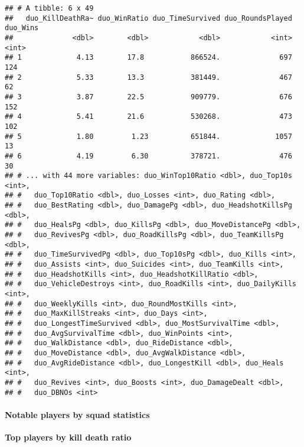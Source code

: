 \documentclass[]{article}
\let\oldparagraph\paragraph
\renewcommand{\paragraph}[1]{\oldparagraph{#1}\mbox{}}
\begin{document}
\begin{verbatim}
## # A tibble: 6 x 49
##   duo_KillDeathRa~ duo_WinRatio duo_TimeSurvived duo_RoundsPlayed duo_Wins
##              <dbl>        <dbl>            <dbl>            <int>    <int>
## 1             4.13        17.8           866524.              697      124
## 2             5.33        13.3           381449.              467       62
## 3             3.87        22.5           909779.              676      152
## 4             5.41        21.6           530268.              473      102
## 5             1.80         1.23          651844.             1057       13
## 6             4.19         6.30          378721.              476       30
## # ... with 44 more variables: duo_WinTop10Ratio <dbl>, duo_Top10s <int>,
## #   duo_Top10Ratio <dbl>, duo_Losses <int>, duo_Rating <dbl>,
## #   duo_BestRating <dbl>, duo_DamagePg <dbl>, duo_HeadshotKillsPg <dbl>,
## #   duo_HealsPg <dbl>, duo_KillsPg <dbl>, duo_MoveDistancePg <dbl>,
## #   duo_RevivesPg <dbl>, duo_RoadKillsPg <dbl>, duo_TeamKillsPg <dbl>,
## #   duo_TimeSurvivedPg <dbl>, duo_Top10sPg <dbl>, duo_Kills <int>,
## #   duo_Assists <int>, duo_Suicides <int>, duo_TeamKills <int>,
## #   duo_HeadshotKills <int>, duo_HeadshotKillRatio <dbl>,
## #   duo_VehicleDestroys <int>, duo_RoadKills <int>, duo_DailyKills <int>,
## #   duo_WeeklyKills <int>, duo_RoundMostKills <int>,
## #   duo_MaxKillStreaks <int>, duo_Days <int>,
## #   duo_LongestTimeSurvived <dbl>, duo_MostSurvivalTime <dbl>,
## #   duo_AvgSurvivalTime <dbl>, duo_WinPoints <int>,
## #   duo_WalkDistance <dbl>, duo_RideDistance <dbl>,
## #   duo_MoveDistance <dbl>, duo_AvgWalkDistance <dbl>,
## #   duo_AvgRideDistance <dbl>, duo_LongestKill <dbl>, duo_Heals <int>,
## #   duo_Revives <int>, duo_Boosts <int>, duo_DamageDealt <dbl>,
## #   duo_DBNOs <int>
\end{verbatim}

\paragraph{Notable players by squad
statistics}\label{notable-players-by-squad-statistics}

\textbf{Top players by kill death ratio}
\end{document}
